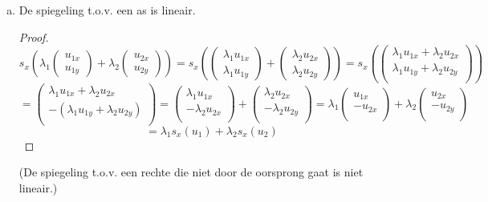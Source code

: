 \documentclass[lineaire_algebra_oplossingen.tex]{subfiles}
\begin{document}
\begin{enumerate}
\begin{enumerate}[a)]
\item De spiegeling t.o.v. een as is lineair.
\begin{proof}
\[
s_x \left(\lambda_1
\begin{pmatrix}
u_{1x}\\u_{1y}
\end{pmatrix} 
+ \lambda_2
\begin{pmatrix}
u_{2x}\\u_{2y}
\end{pmatrix} \right)
 = 
s_x \left(
\begin{pmatrix}
\lambda_1u_{1x}\\\lambda_1u_{1y}
\end{pmatrix} 
+ 
\begin{pmatrix}
\lambda_2u_{2x}\\\lambda_2u_{2y}
\end{pmatrix} \right)
=
s_x \left(
\begin{pmatrix}
\lambda_1u_{1x}+\lambda_2u_{2x}\\\lambda_1u_{1y}+\lambda_2u_{2y}\\
\end{pmatrix} \right)
\]
\[
= 
\begin{pmatrix}
\lambda_1u_{1x}+\lambda_2u_{2x}\\-(\lambda_1u_{1y}+\lambda_2u_{2y})\\
\end{pmatrix} 
=
\begin{pmatrix}
\lambda_1u_{1x}\\-\lambda_2u_{2x}\\
\end{pmatrix}
+
\begin{pmatrix}
\lambda_2u_{2x}\\-\lambda_2u_{2y}\\
\end{pmatrix}
=
\lambda_1
\begin{pmatrix}
u_{1x}\\-u_{2x}\\
\end{pmatrix}
+
\lambda_2
\begin{pmatrix}
u_{2x}\\-u_{2y}\\
\end{pmatrix}
\]
\[
=
\lambda_1s_x(u_1) + \lambda_2s_x(u_2)
\]
\end{proof}
(De spiegeling t.o.v. een rechte die niet door de oorsprong gaat is niet lineair.)


\end{enumerate}
\end{enumerate}
\end{document}
